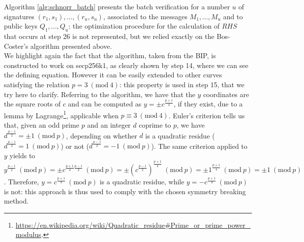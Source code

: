 \bigskip
\noindent
Algorithm \ref{alg:schnorr_batch} presents the batch verification for a number $u$ of signatures $(r_1, s_1), ..., (r_u, s_u)$, associated to the messages $M_1, ..., M_u$ and to public keys $Q_1, ..., Q_u$: the optimization procedure for the calculation of $RHS$ that occurs at step 26 is not represented, but we relied exactly on the Bos-Coster's algorithm presented above. 
\\
We highlight again the fact that the algorithm, taken from the BIP, is constructed to work on secp256k1, as clearly shown by step 14, where we can see the defining equation. However it can be easily extended to other curves satisfying the relation $p = 3 \ (\text{mod} \ 4)$: this property is used in step 15, that we try here to clarify. Referring to the algorithm, we have that the $y$ coordinates are the square roots of $c$ and can be computed as $y = \pm c^{\frac{p + 1}{4}}$, if they exist, due to a lemma by Lagrange\footnote{\url{https://en.wikipedia.org/wiki/Quadratic\_residue\#Prime\_or\_prime\_power\_modulus}.}, applicable when $p \equiv 3 \ (\text{mod} \ 4)$. Euler's criterion tells us that, given an odd prime $p$ and an integer $d$ coprime to $p$, we have $d^{\frac{p - 1}{2}} = \pm 1 \ (\text{mod} \ p)$, depending on whether $d$ is a quadratic residue ($d^{\frac{p - 1}{2}} = 1 \ (\text{mod} \ p)$) or not ($d^{\frac{p - 1}{2}} = - 1 \ (\text{mod} \ p)$). The same criterion applied to $y$ yields to $y^{\frac{p - 1}{2}} \ (\text{mod} \ p) = \pm c^{\frac{p + 1}{4}\frac{p - 1}{2}} \ (\text{mod} \ p) = \pm (c^{\frac{p - 1}{2}})^{\frac{p + 1}{4}} \ (\text{mod} \ p) = \pm 1^{\frac{p + 1}{4}} \ (\text{mod} \ p) = \pm 1 \ (\text{mod} \ p)$. Therefore, $y = c^{\frac{p + 1}{4}} \ (\text{mod} \ p)$ is a quadratic residue, while $y = - c^{\frac{p + 1}{4}} \ (\text{mod} \ p)$ is not: this approach is thus used to comply with the chosen symmetry breaking method.
\begin{figure}
	\label{fig:figure6}
\end{figure}

